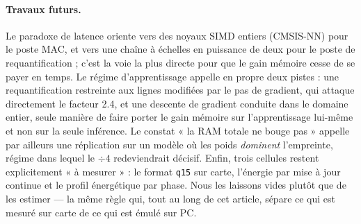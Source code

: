 \paragraph{Travaux futurs.} Le paradoxe de latence oriente vers des noyaux SIMD entiers (CMSIS-NN) pour le
poste MAC, et vers une chaîne à échelles en puissance de deux pour le poste de requantification ; c'est la
voie la plus directe pour que le gain mémoire cesse de se payer en temps. Le régime d'apprentissage appelle
en propre deux pistes : une requantification restreinte aux lignes modifiées par le pas de gradient, qui
attaque directement le facteur \num{2.4}, et une descente de gradient conduite dans le domaine entier, seule
manière de faire porter le gain mémoire sur l'apprentissage lui-même et non sur la seule inférence. Le
constat « la RAM totale ne
bouge pas » appelle par ailleurs une réplication sur un modèle où les poids \emph{dominent} l'empreinte,
régime dans lequel le $\div 4$ redeviendrait décisif. Enfin, trois cellules restent explicitement « à
mesurer » : le format \texttt{q15} sur carte, l'énergie par mise à jour continue et le profil énergétique
par phase. Nous les laissons vides plutôt que de les estimer --- la même règle qui, tout au long de cet
article, sépare ce qui est mesuré sur carte de ce qui est émulé sur PC.
